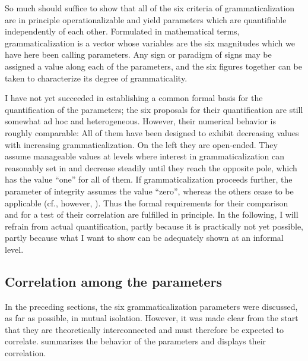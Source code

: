 So much should suffice to show that all of the six criteria of grammaticalization are in principle operationalizable and yield parameters which are quantifiable independently of each other. Formulated in mathematical terms, grammaticalization is a vector whose variables are the six magnitudes which we have here been calling parameters. Any sign or paradigm of signs may be assigned a value along each of the parameters, and the six figures together can be taken to characterize its degree of grammaticality.

I have not yet succeeded in establishing a common formal basis for the quantification of the parameters; the six proposals for their quantification are still somewhat ad hoc and heterogeneous. However, their numerical behavior is roughly comparable: All of them have been designed to exhibit decreasing values with increasing grammaticalization. On the left they are open-ended. They assume manageable values at levels where interest in grammaticalization can reasonably set in and decrease steadily until they reach the opposite pole, which has the value ``one'' for all of them. If grammaticalization proceeds further, the parameter of integrity assumes the value ``zero'', whereas the others cease to be applicable (cf., however, ). Thus the formal requirements for their comparison and for a test of their correlation are fulfilled in principle. In the following, I will refrain from actual quantification, partly because it is practically not yet possible, partly because what I want to show can be adequately shown at an informal level.

\subsection{Correlation among the parameters} \label{sec:4.4.2}

In the preceding sections, the six grammaticalization parameters were discussed, as far as possible, in mutual isolation. However, it was made clear from the start that they are theoretically interconnected and must therefore be expected to correlate.  summarizes the behavior of the parameters and displays their correlation.

